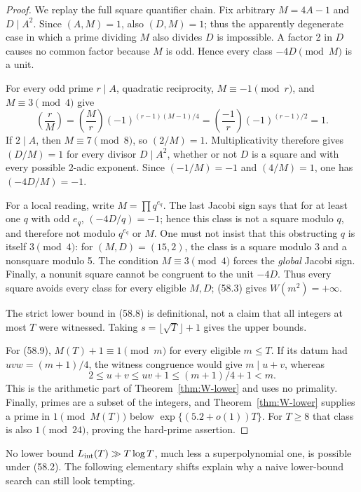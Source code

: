 \documentclass[10pt,reqno]{amsart}
\theoremstyle{definition}
\newcommand{\1}{\mathbf 1}
\begin{document}
\begin{proof}
We replay the full square quantifier chain.  Fix arbitrary $M=4A-1$ and
$D\mid A^2$.  Since $(A,M)=1$, also $(D,M)=1$; thus the apparently
degenerate case in which a prime dividing $M$ also divides $D$ is
impossible.  A factor 2 in $D$ causes no common factor because $M$ is odd.
Hence every class $-4D\pmod M$ is a unit.

For every odd prime $r\mid A$, quadratic reciprocity,
$M\equiv-1\pmod r$, and $M\equiv3\pmod4$ give
\[
 \left(\frac rM\right)
 =\left(\frac Mr\right)(-1)^{(r-1)(M-1)/4}
 =\left(\frac{-1}r\right)(-1)^{(r-1)/2}=1.
\]
If $2\mid A$, then $M\equiv7\pmod8$, so $(2/M)=1$.
Multiplicativity therefore gives $(D/M)=1$ for every divisor $D\mid A^2$,
whether or not $D$ is a square and with every possible 2-adic exponent.
Since $(-1/M)=-1$ and $(4/M)=1$, one has $(-4D/M)=-1$.

For a local reading, write $M=\prod q^{e_q}$.  The last Jacobi sign says
that for at least one $q$ with odd $e_q$, $(-4D/q)=-1$; hence this class is
not a square modulo $q$, and therefore not modulo $q^{e_q}$ or $M$.  One
must not insist that this obstructing $q$ is itself $3\pmod4$: for
$(M,D)=(15,2)$, the class is a square modulo 3 and a nonsquare modulo 5.
The condition $M\equiv3\pmod4$ forces the \emph{global} Jacobi sign.
Finally, a nonunit square cannot be congruent to the unit $-4D$.  Thus every
square avoids every class for every eligible $M,D$; (58.3) gives
$W(m^2)=+\infty$.

The strict lower bound in (58.8) is definitional, not a claim that all
integers at most $T$ were witnessed.  Taking
$s=\lfloor\sqrt T\rfloor+1$ gives the upper bounds.

For (58.9), $M(T)+1\equiv1\pmod m$ for every eligible $m\leq T$.  If its
datum had $uvw=(m+1)/4$, the witness congruence would give $m\mid u+v$,
whereas
\[
 2\leq u+v\leq uv+1\leq(m+1)/4+1<m.
\]
This is the arithmetic part of Theorem~\ref{thm:W-lower} and uses no
primality.  Finally, primes are a subset of the integers, and
Theorem~\ref{thm:W-lower} supplies a prime in $1\pmod {M(T)}$ below
$\exp\{(5.2+o(1))T\}$.  For $T\geq8$ that class is also
$1\pmod {24}$, proving the hard-prime assertion.
\end{proof}

No lower bound $L_{\rm int}(T)\gg T\log T$, much less a superpolynomial one,
is possible under (58.2).  The following elementary shifts explain why a
naive lower-bound search can still look tempting.
\end{document}
